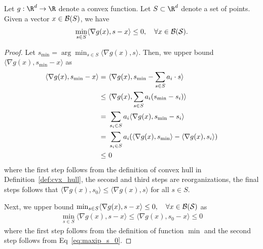 \begin{lemma} \label{lemma:max_ip_condition}
Let $g : \R^d \rightarrow \R$ denote a convex function. Let $S \subset \R^d$ denote a set of points. Given a vector $x\in {\cal B}(S)$, we have
\begin{align*}
\min_{s \in S } \langle \nabla g(x) ,  s-x \rangle  \leq 0, ~~~ \forall x\in \cal{B}(S).
\end{align*}
\end{lemma}

\begin{proof}
Let $s_{\min}=\arg\min_{s\in S} \langle \nabla g(x) ,  s \rangle $. Then, we upper bound $\langle \nabla g(x) ,  s_{\min}-x \rangle$ as
\begin{align}\label{eq:maxip_s_0}
    \langle \nabla g(x) ,  s_{\min}-x \rangle =&~\langle \nabla g(x) ,  s_{\min}-\sum_{s\in S} a_i\cdot s \rangle\notag\\
    \leq &~\langle \nabla g(x) ,  \sum_{s\in S}a_i( s_{\min}- s_i) \rangle \notag\\
    = &~\sum_{s_i\in S}a_i \langle \nabla g(x) ,   s_{\min}- s_i \rangle \notag\\
    = &~\sum_{s_i\in S}a_i (\langle \nabla g(x) ,   s_{\min} \rangle -\langle \nabla g(x) ,   s_i \rangle )\notag\\
    \leq&~ 0
\end{align}
where the first step follows from the definition of convex hull in Definition~\ref{def:cvx_hull}, the second and third steps are reorganizations, the final steps follows that $\langle \nabla g(x) ,   s_0 \rangle \leq \langle \nabla g(x) ,   s \rangle$ for all $s\in S$.

Next, we upper bound $\min_{s \in S } \langle \nabla g(x) ,  s-x \rangle  \leq 0, ~~~ \forall x\in \cal{B}(S)$ as
\begin{align*}
    \min_{s \in S } \langle \nabla g(x) ,  s-x \rangle  \leq  \langle \nabla g(x) ,  s_0-x \rangle  \leq 0
\end{align*}
where the first step follows from the definition of function $\min$ and the second step follows from Eq~\eqref{eq:maxip_s_0}.
\end{proof}
\fi 